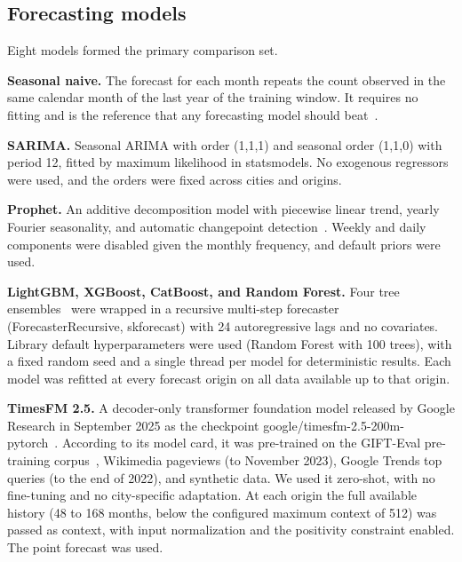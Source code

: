 \documentclass[10pt,letterpaper]{article}
\begin{document}
\subsection*{Forecasting models}
Eight models formed the primary comparison set.

\textbf{Seasonal naive.} The forecast for each month repeats the count observed in the same calendar month of the last year of the training window. It requires no fitting and is the reference that any forecasting model should beat~\cite{Hewamalage2023}.

\textbf{SARIMA.} Seasonal ARIMA with order (1,1,1) and seasonal order (1,1,0) with period 12, fitted by maximum likelihood in statsmodels. No exogenous regressors were used, and the orders were fixed across cities and origins.

\textbf{Prophet.} An additive decomposition model with piecewise linear trend, yearly Fourier seasonality, and automatic changepoint detection~\cite{Taylor2018prophet}. Weekly and daily components were disabled given the monthly frequency, and default priors were used.

\textbf{LightGBM, XGBoost, CatBoost, and Random Forest.} Four tree ensembles~\cite{Ke2017lightgbm,Chen2016xgboost,Prokhorenkova2018catboost,Breiman2001} were wrapped in a recursive multi-step forecaster (ForecasterRecursive, skforecast) with 24 autoregressive lags and no covariates. Library default hyperparameters were used (Random Forest with 100 trees), with a fixed random seed and a single thread per model for deterministic results. Each model was refitted at every forecast origin on all data available up to that origin.

\textbf{TimesFM 2.5.} A decoder-only transformer foundation model released by Google Research in September 2025 as the checkpoint google/timesfm-2.5-200m-pytorch~\cite{Das2024timesfm,TimesFM25card}. According to its model card, it was pre-trained on the GIFT-Eval pre-training corpus~\cite{Aksu2024gifteval}, Wikimedia pageviews (to November 2023), Google Trends top queries (to the end of 2022), and synthetic data. We used it zero-shot, with no fine-tuning and no city-specific adaptation. At each origin the full available history (48 to 168 months, below the configured maximum context of 512) was passed as context, with input normalization and the positivity constraint enabled. The point forecast was used.
\end{document}
